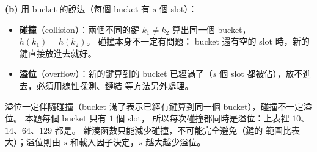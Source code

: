 \begin{pastsoln}
\textbf{(b)} 用 bucket 的說法（每個 bucket 有 $s$ 個 slot）：
\begin{itemize}
\item \textbf{碰撞}（collision）：兩個不同的鍵 $k_1 \ne k_2$ 算出同一個 bucket，$h(k_1) = h(k_2)$。 碰撞本身不一定有問題：
bucket 還有空的 slot 時，新的鍵直接放進去就好。
\item \textbf{溢位}（overflow）：新的鍵算到的 bucket 已經滿了（$s$ 個 slot 都被佔），放不進去，必須用線性探測、鏈結
等方法另外處理。
\end{itemize}
溢位一定伴隨碰撞（bucket 滿了表示已經有鍵算到同一個 bucket），碰撞不一定溢位。 本題每個 bucket 只有 $1$ 個 slot，
所以每次碰撞都同時是溢位：上表裡 $10$、$14$、$64$、$129$ 都是。 雜湊函數只能減少碰撞，不可能完全避免（鍵的
範圍比表大）；溢位則由 $s$ 和載入因子決定，$s$ 越大越少溢位。
\end{pastsoln}
